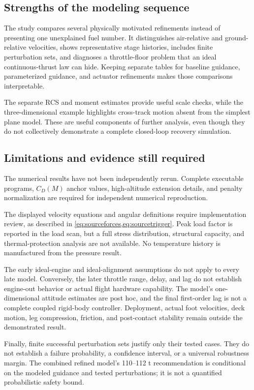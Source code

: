 \documentclass[11pt,a4paper]{article}
\begin{document}
\subsection{Strengths of the modeling sequence}
The study compares several physically motivated refinements instead of presenting one unexplained fuel number. It distinguishes air-relative and ground-relative velocities, shows representative stage histories, includes finite perturbation sets, and diagnoses a throttle-floor problem that an ideal continuous-thrust law can hide. Keeping separate tables for baseline guidance, parameterized guidance, and actuator refinements makes those comparisons interpretable.

The separate RCS and moment estimates provide useful scale checks, while the three-dimensional example highlights cross-track motion absent from the simplest plane model. These are useful components of further analysis, even though they do not collectively demonstrate a complete closed-loop recovery simulation.

\subsection{Limitations and evidence still required}
The numerical results have not been independently rerun. Complete executable programs, $C_D(M)$ anchor values, high-altitude extension details, and penalty normalization are required for independent numerical reproduction.

The displayed velocity equations and angular definitions require implementation review, as described in \cref{eq:sourceforces,eq:sourcetrigger}. Peak load factor is reported in the load scan, but a full stress distribution, structural capacity, and thermal-protection analysis are not available. No temperature history is manufactured from the pressure result.

The early ideal-engine and ideal-alignment assumptions do not apply to every late model. Conversely, the later throttle range, delay, and lag do not establish engine-out behavior or actual flight hardware capability. The model's one-dimensional attitude estimates are post hoc, and the final first-order lag is not a complete coupled rigid-body controller. Deployment, actual foot velocities, deck motion, leg compression, friction, and post-contact stability remain outside the demonstrated result.

Finally, finite successful perturbation sets justify only their tested cases. They do not establish a failure probability, a confidence interval, or a universal robustness margin. The combined refined model's 110--112 t recommendation is conditional on the modeled guidance and tested perturbations; it is not a quantified probabilistic safety bound.
\end{document}
